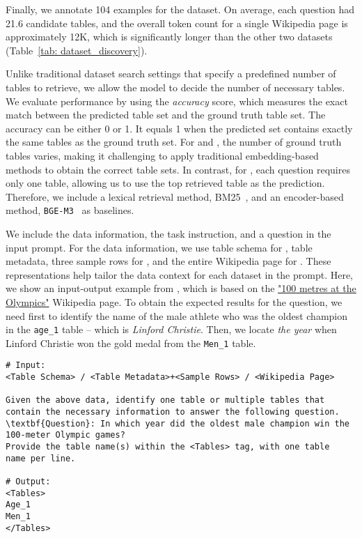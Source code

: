Finally, we annotate 104 examples for the \wikipage dataset. On average, each question had 21.6 candidate tables, and the overall token count for a single Wikipedia page is approximately 12K, which is significantly longer than the other two datasets (Table~\ref{tab: dataset_discovery}).

%
Unlike traditional dataset search settings that specify a predefined number of tables to retrieve, we allow the model to decide the number of necessary tables. We evaluate performance by using the \textit{accuracy} score, which measures the exact match between the predicted table set and the ground truth table set. The accuracy can be either 0 or 1. It equals 1 when the predicted set contains exactly the same tables as the ground truth set.
%
For \birdselect and \wikipage, the number of ground truth tables varies, making it challenging to apply traditional embedding-based methods to obtain the correct table sets. In contrast, for \openwikiselect, each question requires only one table, allowing us to use the top retrieved table as the prediction. Therefore, we include a lexical retrieval method, BM25~\citep{bm25}, and an encoder-based method, \texttt{BGE-M3}~\citep{chen-etal-2024-m3} as baselines.
 
\label{sec:table_selection_prompts}
%
We include the data information, the task instruction, and a question in the input prompt. For the data information, we use table schema for \birdselect, table metadata, three sample rows for \openwikiselect, and the entire Wikipedia page for \wikipage. These representations help tailor the data context for each dataset in the prompt. Here, we show an input-output example from \wikipage, which is based on the \href{https://en.wikipedia.org/wiki/100_metres_at_the_Olympics}{"100 metres at the Olympics"} Wikipedia page. To obtain the expected results for the question, we need first to identify the name of the male athlete who was the oldest champion in the \texttt{age\_1} table -- which is \emph{Linford Christie}. Then, we locate \emph{the year} when Linford Christie won the gold medal from the \texttt{Men\_1} table. 

\begin{tcolorbox}[left=1pt, right=0pt, top=1pt, bottom=1pt]
\begin{Verbatim}
# Input:
<Table Schema> / <Table Metadata>+<Sample Rows> / <Wikipedia Page>

Given the above data, identify one table or multiple tables that 
contain the necessary information to answer the following question.
\textbf{Question}: In which year did the oldest male champion win the 
100-meter Olympic games?
Provide the table name(s) within the <Tables> tag, with one table 
name per line.

# Output: 
<Tables>
Age_1
Men_1
</Tables>
\end{Verbatim}
\end{tcolorbox}

